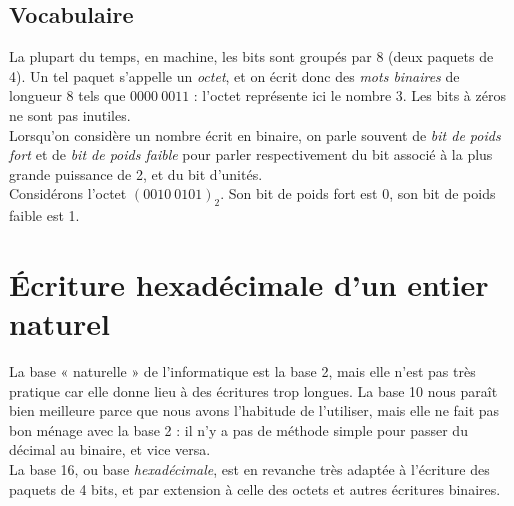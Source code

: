 \subsection{Vocabulaire}

\medskip\par

La plupart du temps, en machine, les bits sont groupés par 8 (deux paquets de 4). Un tel paquet s'appelle un \textit{octet}, et on écrit donc des \textit{mots binaires} de longueur 8 tels que $0000\ 0011$ : l'octet représente ici le nombre 3. Les bits à zéros ne sont pas inutiles.\\

Lorsqu'on considère un nombre écrit en binaire, on parle souvent de \textit{bit de poids fort} et de
\textit{bit de poids faible} pour parler respectivement du bit associé à la plus grande puissance de 2, et du bit
d'unités.\\
Considérons l'octet $(0010\ 0101)_2$. Son bit de poids fort est 0, son bit de poids faible est 1.

\section{\'Ecriture hexadécimale d'un entier naturel}

La base «  naturelle  » {} de l'informatique est la base 2, mais elle n'est pas très pratique car elle donne lieu à
des écritures trop longues.
La base 10 nous paraît bien meilleure parce que nous avons l'habitude de l'utiliser, mais elle ne fait pas bon ménage
avec la base 2 : il n'y a pas de méthode simple pour passer du décimal au binaire, et vice versa.\\
La base 16, ou base \textit{hexadécimale}, est en revanche très adaptée à l'écriture des paquets de 4 bits, et par
extension à celle des octets et autres écritures binaires.\\

